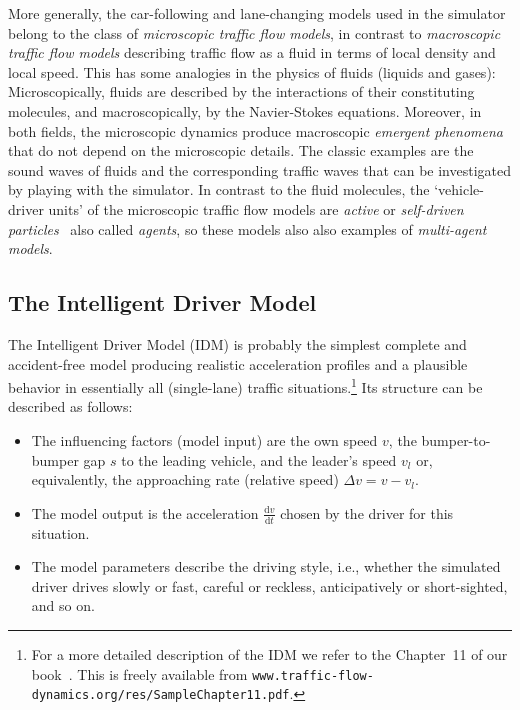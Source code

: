 \documentclass[paper=A4,pagesize=auto,11pt]{scrartcl}
\providecommand{\gquote}[1]{`#1'}
\newcommand{\D}{\text{d}}
\providecommand{\abl}[2] {\frac{\D #1}{\D #2}}
\begin{document}
More generally, the car-following and lane-changing models used in the
simulator belong to the class of
\textit{microscopic traffic flow models}, in contrast to
\textit{macroscopic traffic flow models} describing traffic flow as a
fluid in terms of local density and local speed. This has some
analogies in the physics of fluids (liquids and gases):
Microscopically, fluids are 
described by the interactions of their constituting  molecules, and
macroscopically,  
by the Navier-Stokes equations.  Moreover, in both fields, the
microscopic dynamics produce macroscopic \textit{emergent phenomena}
that do not depend on the microscopic details. The classic examples
are the sound waves of fluids and the corresponding traffic waves that
can be investigated by playing with the simulator. In contrast to the
fluid molecules, the \gquote{vehicle-driver units} of the microscopic
traffic flow models are \emph{active} or \emph{self-driven
  particles}~\cite{Opus,TreiberKesting-Book} also called 
\emph{agents}, so  these models also also examples of
\emph{multi-agent models}. 

\subsection{The Intelligent Driver Model}\label{sec:IDM}
The Intelligent Driver Model (IDM)  is probably the simplest complete and
accident-free model producing realistic acceleration profiles and a
plausible behavior in essentially all (single-lane) traffic
situations.\footnote{For a more detailed description of the IDM we
  refer to the Chapter~11 of our book~\cite{TreiberKesting-Book}. This
  is freely available from
  \texttt{www.traffic-flow-dynamics.org/res/SampleChapter11.pdf}.} 
Its structure can be described as follows:
\begin{itemize}
\item
The influencing factors (model input) are the own speed $v$, the
bumper-to-bumper gap $s$ to the leading vehicle, and the leader's
speed $v_l$ or, equivalently, the approaching rate (relative speed)
$\Delta v=v-v_l$. 
\item
The model output is the acceleration $\abl{v}{t}$ chosen by the driver for this situation.
\item
The model parameters describe the driving style, i.e., whether the
simulated driver drives slowly or fast, careful or reckless,
anticipatively or short-sighted, and so on.
\end{itemize}
\end{document}

